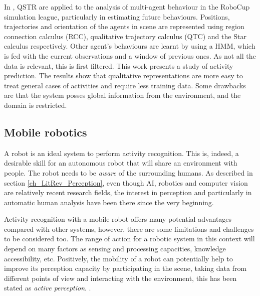 In \citep{Young13_PredcitingSituatedBehaviour,Young14_EffectsTraining}, QSTR are applied to the analysis of multi-agent behaviour in the RoboCup simulation league, particularly in estimating future behaviours. 
Positions, trajectories and orientation of the agents in scene are represented using region connection calculus (RCC), qualitative trajectory calculus (QTC) and the Star calculus respectively. 
Other agent's behaviours are learnt by using a HMM, which is fed with the current observations and a window of previous ones. 
As not all the data is relevant, this is first filtered. 
This work presents a study of activity prediction.
The results show that qualitative representations are more easy to treat general cases of activities and require less training data. 
Some drawbacks are that the system posses global information from the environment, and the domain is restricted.








\subsection{Mobile robotics}
A robot is an ideal system to perform activity recognition. 
This is, indeed, a desirable skill for an autonomous robot that will share an environment with people.
The robot needs to be \textit{aware} of the surrounding humans.
As described in section \ref{ch_LitRev_Perception}, even though AI, robotics and computer vision are relatively recent research fields, the interest in perception and particularly in automatic human analysis have been there since the very beginning.

Activity recognition with a mobile robot offers many potential advantages compared with other systems, however, there are some limitations and challenges to be considered too.
The range of action for a robotic system in this context will depend on many factors as sensing and processing capacities, knowledge accessibility, etc.
Positively, the mobility of a robot can potentially help to improve its perception capacity by participating in the scene, taking data from different points of view and interacting with the environment, this has been stated as \textit{active perception}. \citep{Bajcsy88_ActivePerception}.

